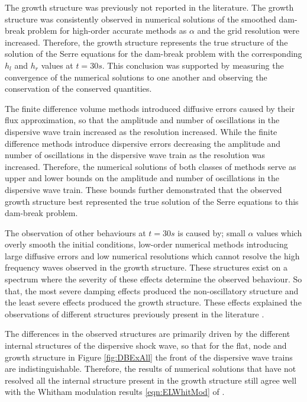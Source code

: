 The growth structure was previously not reported in the literature. The growth structure was consistently observed in numerical solutions of the smoothed dam-break problem for high-order accurate methods as $\alpha$ and the grid resolution were increased. Therefore, the growth structure represents the true structure of the solution of the Serre equations for the dam-break problem with the corresponding $h_l$ and $h_r$ values at $t=30s$. This conclusion was supported by measuring the convergence of the numerical solutions to one another and observing the conservation of the conserved quantities. 

The finite difference volume methods introduced diffusive errors caused by their flux approximation, so that the amplitude and number of oscillations in the dispersive wave train increased as the resolution increased. While the finite difference methods introduce dispersive errors decreasing the amplitude and number of oscillations in the dispersive wave train as the resolution was increased. Therefore, the numerical solutions of both classes of methods serve as upper and lower bounds on the amplitude and number of oscillations in the dispersive wave train. These bounds further demonstrated that the observed growth structure best represented the true solution of the Serre equations to this dam-break problem. 

The observation of other behaviours at $t=30s$ is caused by; small $\alpha$ values which overly smooth the initial conditions, low-order numerical methods introducing large diffusive errors and low numerical resolutions which cannot resolve the high frequency waves observed in the growth structure. These structures exist on a spectrum where the severity of these effects determine the observed behaviour. So that, the most severe damping effects produced the non-oscillatory structure and the least severe effects produced the growth structure. These effects explained the observations of different structures previously present in the literature \cite{El-etal-2006,Hank-etal-2010-2034,Mitsotakis-etal-2014,Mitsotakis-etal-2017}. 

The differences in the observed structures are primarily driven by the different internal structures of the dispersive shock wave, so that for the flat, node and growth structure in Figure \ref{fig:DBExAll} the front of the dispersive wave trains are indistinguishable. Therefore, the results of numerical solutions that have not resolved all the internal structure present in the growth structure still agree well with the Whitham modulation results \eqref{eqn:ELWhitMod} of \citet{El-etal-2006}.

